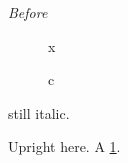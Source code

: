 \documentclass{article}
\begin{document}
{\itshape Before \begin{figure}x\caption{c}\label{f1}\end{figure} still italic.}
Upright here.
A \cref{f1}.
\end{document}
